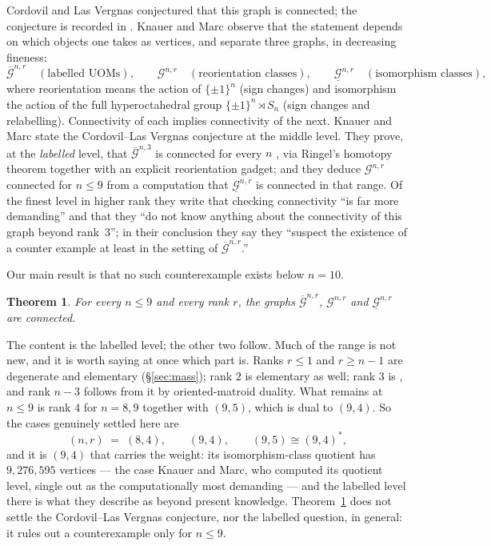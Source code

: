 \documentclass[11pt]{amsart}
\newtheorem{theorem}{Theorem}
\theoremstyle{remark}
\newcommand{\Gb}{\overline{\mathcal{G}}}
\newcommand{\Gm}{\mathcal{G}}
\newcommand{\Gu}{\underline{\mathcal{G}}}
\begin{document}
Cordovil and Las Vergnas conjectured that this graph is connected; the
conjecture is recorded in \cite{RS88}. Knauer and Marc \cite{KM23} observe that the
statement depends on which objects one takes as vertices, and separate
three graphs, in decreasing fineness:
\[
  \Gb^{n,r} \quad(\text{labelled UOMs}), \qquad
  \Gm^{n,r} \quad(\text{reorientation classes}), \qquad
  \Gu^{n,r} \quad(\text{isomorphism classes}),
\]
where reorientation means the action of $\{\pm1\}^n$ (sign changes) and
isomorphism the action of the full hyperoctahedral group
$\{\pm1\}^n\rtimes S_n$ (sign changes and relabelling). Connectivity of
each implies connectivity of the next. Knauer and Marc state the
Cordovil--Las Vergnas conjecture at the middle level. They prove, at the
\emph{labelled} level, that $\Gb^{n,3}$ is connected for every $n$
\cite[Prop.~3.2]{KM23}, via Ringel's homotopy theorem together with an
explicit reorientation gadget; and they deduce $\Gm^{n,r}$ connected for
$n\le 9$ from a computation that $\Gu^{n,r}$ is connected in that range.
Of the finest level in higher rank they write that checking connectivity
``is far more demanding'' and that they ``do not know anything about the
connectivity of this graph beyond rank~3''; in their conclusion they say
they ``suspect the existence of a counter example at least in the setting
of $\Gb^{n,r}$.''

Our main result is that no such counterexample exists below $n=10$.

\begin{theorem}\label{thm:main}
For every $n\le 9$ and every rank $r$, the graphs $\Gb^{n,r}$,
$\Gm^{n,r}$ and $\Gu^{n,r}$ are connected.
\end{theorem}

The content is the labelled level; the other two follow. Much of the
range is not new, and it is worth saying at once which part is. Ranks
$r\le 1$ and $r\ge n-1$ are degenerate and elementary
(\S\ref{sec:mass}); rank $2$ is elementary as well; rank $3$ is
\cite[Prop.~3.2]{KM23}, and rank $n-3$ follows from it by
oriented-matroid duality. What remains at $n\le 9$ is rank $4$ for
$n=8,9$ together with $(9,5)$, which is dual to $(9,4)$. So the cases
genuinely settled here are
\[
  (n,r)\;=\;(8,4),\qquad (9,4),\qquad (9,5)\cong(9,4)^{*},
\]
and it is $(9,4)$ that carries the weight: its isomorphism-class
quotient has $9{,}276{,}595$ vertices — the case Knauer and Marc, who
computed its quotient level, single out as the computationally most
demanding — and the labelled level there is what they describe as
beyond present knowledge. Theorem~\ref{thm:main} does not settle the
Cordovil--Las Vergnas conjecture, nor the labelled question, in general:
it rules out a counterexample only for $n\le 9$.
\end{document}
